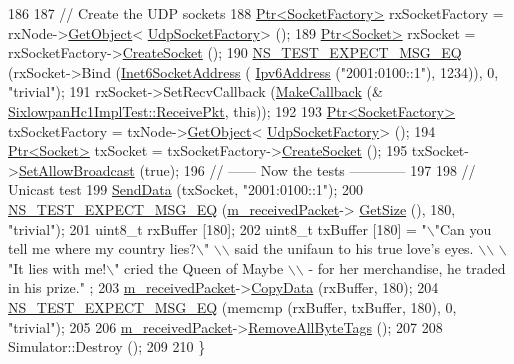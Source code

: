 \begin{DoxyCode}
186 
187   \textcolor{comment}{// Create the UDP sockets}
188   \hyperlink{classns3_1_1Ptr}{Ptr<SocketFactory>} rxSocketFactory = rxNode->\hyperlink{classns3_1_1Object_a13e18c00017096c8381eb651d5bd0783}{GetObject}<
      \hyperlink{classns3_1_1UdpSocketFactory}{UdpSocketFactory}> ();
189   \hyperlink{classns3_1_1Ptr}{Ptr<Socket>} rxSocket = rxSocketFactory->\hyperlink{classns3_1_1SocketFactory_a97351e6e7860503a4912042530449f62}{CreateSocket} ();
190   \hyperlink{group__testing_ga7304ba46a28d8cf08dfdfd6499cf7068}{NS\_TEST\_EXPECT\_MSG\_EQ} (rxSocket->Bind (\hyperlink{classns3_1_1Inet6SocketAddress}{Inet6SocketAddress} (
      \hyperlink{classns3_1_1Ipv6Address}{Ipv6Address} (\textcolor{stringliteral}{"2001:0100::1"}), 1234)), 0, \textcolor{stringliteral}{"trivial"});
191   rxSocket->SetRecvCallback (\hyperlink{group__makecallbackmemptr_ga9376283685aa99d204048d6a4b7610a4}{MakeCallback} (&
      \hyperlink{classSixlowpanHc1ImplTest_a8be144b5b29cfd9862a78547479a6b0d}{SixlowpanHc1ImplTest::ReceivePkt}, \textcolor{keyword}{this}));
192 
193   \hyperlink{classns3_1_1Ptr}{Ptr<SocketFactory>} txSocketFactory = txNode->\hyperlink{classns3_1_1Object_a13e18c00017096c8381eb651d5bd0783}{GetObject}<
      \hyperlink{classns3_1_1UdpSocketFactory}{UdpSocketFactory}> ();
194   \hyperlink{classns3_1_1Ptr}{Ptr<Socket>} txSocket = txSocketFactory->\hyperlink{classns3_1_1SocketFactory_a97351e6e7860503a4912042530449f62}{CreateSocket} ();
195   txSocket->\hyperlink{classns3_1_1Socket_a32b4fa27b732a63207c8d9054a817ed5}{SetAllowBroadcast} (\textcolor{keyword}{true});
196   \textcolor{comment}{// ------ Now the tests ------------}
197 
198   \textcolor{comment}{// Unicast test}
199   \hyperlink{classSixlowpanHc1ImplTest_ab7fde43d2562fa00a12bd110d0760979}{SendData} (txSocket, \textcolor{stringliteral}{"2001:0100::1"});
200   \hyperlink{group__testing_ga7304ba46a28d8cf08dfdfd6499cf7068}{NS\_TEST\_EXPECT\_MSG\_EQ} (\hyperlink{classSixlowpanHc1ImplTest_af5bac1362846db4b9764c7fcb9a84178}{m\_receivedPacket}->
      \hyperlink{classns3_1_1Packet_a462855c9929954d4301a4edfe55f4f1c}{GetSize} (), 180, \textcolor{stringliteral}{"trivial"});
201   uint8\_t rxBuffer [180];
202   uint8\_t txBuffer [180] = \textcolor{stringliteral}{"\(\backslash\)"Can you tell me where my country lies?\(\backslash\)" \(\backslash\)\(\backslash\) said the unifaun to his true
       love's eyes. \(\backslash\)\(\backslash\) \(\backslash\)"It lies with me!\(\backslash\)" cried the Queen of Maybe \(\backslash\)\(\backslash\) - for her merchandise, he traded in his prize."}
      ;
203   \hyperlink{classSixlowpanHc1ImplTest_af5bac1362846db4b9764c7fcb9a84178}{m\_receivedPacket}->\hyperlink{classns3_1_1Packet_a5a6d304b9e0d90733919ffe224b98f0d}{CopyData} (rxBuffer, 180);
204   \hyperlink{group__testing_ga7304ba46a28d8cf08dfdfd6499cf7068}{NS\_TEST\_EXPECT\_MSG\_EQ} (memcmp (rxBuffer, txBuffer, 180), 0, \textcolor{stringliteral}{"trivial"});
205 
206   \hyperlink{classSixlowpanHc1ImplTest_af5bac1362846db4b9764c7fcb9a84178}{m\_receivedPacket}->\hyperlink{classns3_1_1Packet_a083f54c9db31aeff30551a9e20fcda42}{RemoveAllByteTags} ();
207 
208   Simulator::Destroy ();
209 
210 \}
\end{DoxyCode}


